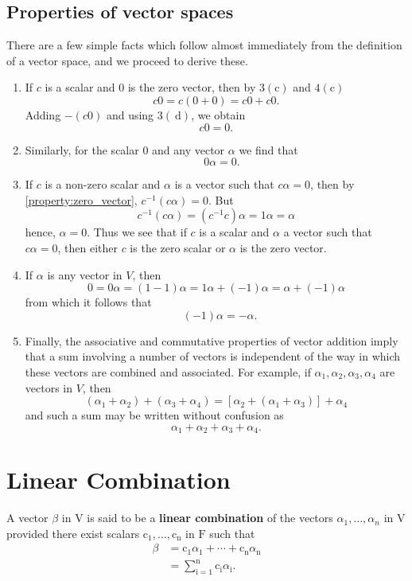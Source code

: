 \documentclass[main.tex]{subfiles}
\begin{document}
\subsection*{Properties of vector spaces}
There are a few simple facts which follow almost immediately from the definition of a vector space, and we proceed to derive these. 
\begin{enumerate}
    \item If $c$ is a scalar and 0 is the zero vector, then by $3(\mathrm{c})$ and $4(\mathrm{c})$
$$
c 0=c(0+0)=c 0+c 0 .
$$
Adding $-(c 0)$ and using $3(\mathrm{~d})$, we obtain
\begin{equation}\label{property:zero_vector}
c 0=0 .
\end{equation}
\item Similarly, for the scalar 0 and any vector $\alpha$ we find that
$$\quad 0 \alpha=0 .
$$
\item If $c$ is a non-zero scalar and $\alpha$ is a vector such that $c \alpha=0$, then by \ref{property:zero_vector}, $c^{-1}(c \alpha)=0$. But
$$
c^{-1}(c \alpha)=\left(c^{-1} c\right) \alpha=1 \alpha=\alpha
$$
hence, $\alpha=0$. Thus we see that if $c$ is a scalar and $\alpha$ a vector such that $c \alpha=0$, then either $c$ is the zero scalar or $\alpha$ is the zero vector.

\item If $\alpha$ is any vector in $V$, then
$$
0=0 \alpha=(1-1) \alpha=1 \alpha+(-1) \alpha=\alpha+(-1) \alpha
$$
from which it follows that
$$
\quad(-1) \alpha=-\alpha \text {. }
$$

\item Finally, the associative and commutative properties of vector addition imply that a sum involving a number of vectors is independent of the way in which these vectors are combined and associated. For example, if $\alpha_1, \alpha_2, \alpha_3, \alpha_4$ are vectors in $V$, then
$$
\left(\alpha_1+\alpha_2\right)+\left(\alpha_3+\alpha_4\right)=\left[\alpha_2+\left(\alpha_1+\alpha_3\right)\right]+\alpha_4
$$
and such a sum may be written without confusion as
$$
\alpha_1+\alpha_2+\alpha_3+\alpha_4 .
$$
\end{enumerate}

\section{Linear Combination}
\begin{definition}
 A vector $\beta$ in $\mathrm{V}$ is said to be a \textbf{linear combination} of the vectors $\alpha_1, \ldots, \alpha_n$ in $\mathrm{V}$ provided there exist scalars $\mathrm{c}_1, \ldots, \mathrm{c}_{\mathrm{n}}$ in $\mathrm{F}$ such that
$$
\begin{aligned}
\beta & =\mathrm{c}_1 \alpha_1+\cdots+\mathrm{c}_{\mathrm{n}} \alpha_{\mathrm{n}} \\
& =\sum_{\mathrm{i}=1}^{\mathrm{n}} \mathrm{c}_{\mathrm{i}} \alpha_{\mathrm{i}} .
\end{aligned}
$$
\end{definition}
\end{document}
